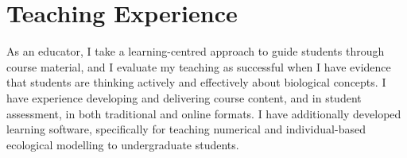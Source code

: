 \documentclass[letterpaper]{article}
\begin{document}
\newpage

\section*{Teaching Experience}
\hrulefill

\vspace{0.06in}

As an educator, I take a learning-centred approach to guide students through course material, and I evaluate my teaching as successful when I have evidence that students are thinking actively and effectively about biological concepts. I have experience developing and delivering course content, and in student assessment, in both traditional and online formats. I have additionally developed learning software, specifically for teaching numerical and individual-based ecological modelling to undergraduate students.

\hrulefill

\end{document}

